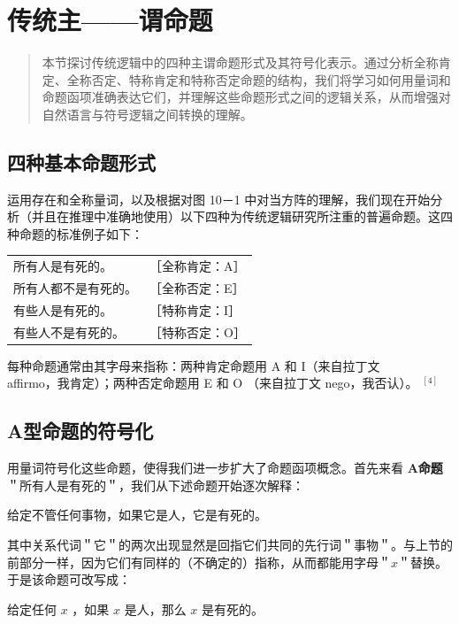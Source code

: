 \section{传统主——谓命题}

\begin{quotation}
本节探讨传统逻辑中的四种主谓命题形式及其符号化表示。通过分析全称肯定、全称否定、特称肯定和特称否定命题的结构，我们将学习如何用量词和命题函项准确表达它们，并理解这些命题形式之间的逻辑关系，从而增强对自然语言与符号逻辑之间转换的理解。
\end{quotation}

\subsection{四种基本命题形式}

运用存在和全称量词，以及根据对图 10－1 中对当方阵的理解，我们现在开始分析（并且在推理中准确地使用）以下四种为传统逻辑研究所注重的普遍命题。这四种命题的标准例子如下：

\begin{center}
\begin{tabular}{ll}
所有人是有死的。 & ［全称肯定：A］ \\
所有人都不是有死的。 & ［全称否定：E］ \\
有些人是有死的。 & ［特称肯定：I］ \\
有些人不是有死的。 & ［特称否定：O］ \\
\end{tabular}
\end{center}

每种命题通常由其字母来指称：两种肯定命题用 A 和 I（来自拉丁文\\
affirmo，我肯定）；两种否定命题用 E 和 O （来自拉丁文 nego，我否认）。 ${ }^{[4]}$

\subsection{A型命题的符号化}

用量词符号化这些命题，使得我们进一步扩大了命题函项概念。首先来看 \textbf{A命题}＂所有人是有死的＂，我们从下述命题开始逐次解释：

给定不管任何事物，如果它是人，它是有死的。

其中关系代词＂它＂的两次出现显然是回指它们共同的先行词＂事物＂。与上节的前部分一样，因为它们有同样的（不确定的）指称，从而都能用字母＂$x$＂替换。于是该命题可改写成：

给定任何 $x$ ，如果 $x$ 是人，那么 $x$ 是有死的。

